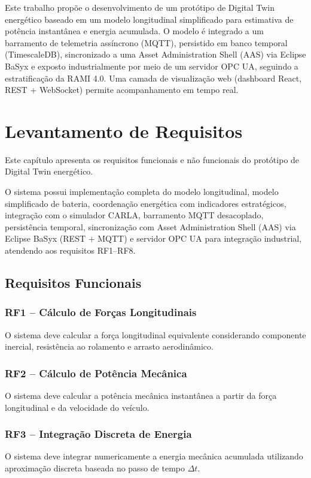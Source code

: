 \documentclass[12pt,a4paper]{report}
\begin{document}
Este trabalho propõe o desenvolvimento de um protótipo de Digital Twin energético baseado em um modelo longitudinal simplificado para estimativa de potência instantânea e energia acumulada. O modelo é integrado a um barramento de telemetria assíncrono (MQTT), persistido em banco temporal (TimescaleDB), sincronizado a uma Asset Administration Shell (AAS) via Eclipse BaSyx e exposto industrialmente por meio de um servidor OPC UA, seguindo a estratificação da RAMI 4.0. Uma camada de visualização web (dashboard React, REST + WebSocket) permite acompanhamento em tempo real.

\chapter{Levantamento de Requisitos}

Este capítulo apresenta os requisitos funcionais e não funcionais
do protótipo de Digital Twin energético.

O sistema possui implementação completa do modelo longitudinal,
modelo simplificado de bateria, coordenação energética com
indicadores estratégicos, integração com o simulador CARLA,
barramento MQTT desacoplado, persistência temporal, sincronização
com Asset Administration Shell (AAS) via Eclipse BaSyx (REST + MQTT)
e servidor OPC UA para integração industrial, atendendo aos
requisitos RF1--RF8.

\section{Requisitos Funcionais}

\subsection*{RF1 -- Cálculo de Forças Longitudinais}
O sistema deve calcular a força longitudinal equivalente considerando componente inercial, resistência ao rolamento e arrasto aerodinâmico.

\subsection*{RF2 -- Cálculo de Potência Mecânica}
O sistema deve calcular a potência mecânica instantânea a partir da força longitudinal e da velocidade do veículo.

\subsection*{RF3 -- Integração Discreta de Energia}
O sistema deve integrar numericamente a energia mecânica acumulada utilizando aproximação discreta baseada no passo de tempo $\Delta t$.
\end{document}
